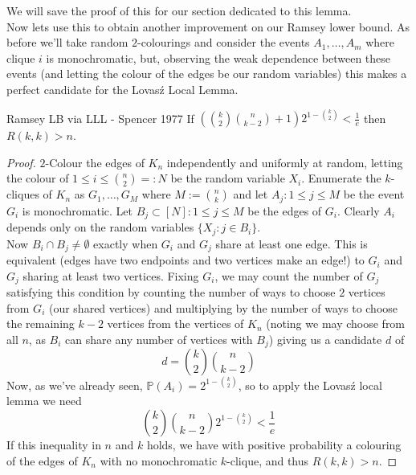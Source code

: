 \documentclass{article}
\begin{document}
We will save the proof of this for our section dedicated to this lemma. \\

Now lets use this to obtain another improvement on our Ramsey lower bound. As before we'll take random $2$-colourings 
and consider the events $A_1, \dots, A_m$ where clique $i$ is monochromatic, but, observing the weak dependence 
between these events (and letting the colour of the edges be our random variables) this makes a perfect candidate 
for the Lovas\'{z} Local Lemma. 

\begin{proposition}[]{Ramsey LB via LLL - Spencer 1977}
    If $\left(\binom{k}{2}\binom{n}{k-2} + 1\right)2^{1 - \binom{k}{2}} < \frac{1}{e}$ then $R(k, k) > n$. 
\end{proposition}

\begin{proof}
    $2$-Colour the edges of $K_n$ independently and uniformly at random, letting the colour of $1 \leq i \leq 
    \binom{n}{2}=: N$ be the random variable $X_i$. Enumerate the $k$-cliques of $K_n$ as $G_1, \dots, G_M$ where 
    $M := \binom{n}{k}$ and let $A_j: 1 \leq j \leq M$ be the event $G_i$ is monochromatic. Let 
    $B_j \subset [N]: 1 \leq j \leq M$ be the edges of $G_i$. Clearly $A_i$ depends only on
    the random variables $\{X_j : j \in B_i\}$. \\

    Now $B_i \cap B_j \neq \emptyset$ exactly when $G_i$ and $G_j$ share at least one edge. This is equivalent 
    (edges have two endpoints and two vertices make an edge!) to $G_i$ and $G_j$ sharing at least two vertices. 
    Fixing $G_i$, we may count the number of $G_j$ satisfying this condition by counting the number of ways to 
    choose $2$ vertices from $G_i$ (our shared vertices) and multiplying by the number of ways to choose the remaining 
    $k-2$ vertices from the vertices of $K_n$ (noting we may choose from all $n$, as $B_i$ can share any number of 
    vertices with $B_j$) giving us a candidate $d$ of 
    \[d = \binom{k}{2}\binom{n}{k-2}\]
    Now, as we've already seen, $\mathbb{P}(A_i) = 2^{1 - \binom{k}{2}}$, so to apply the Lovas\'{z} local lemma 
    we need 
    \[\binom{k}{2}\binom{n}{k-2}2^{1 - \binom{k}{2}} < \frac{1}{e}\]
    If this inequality in $n$ and $k$ holds, we have with positive probability a colouring of the edges of $K_n$
    with no monochromatic $k$-clique, and thus $R(k, k) > n$. 
\end{proof}
\end{document}
